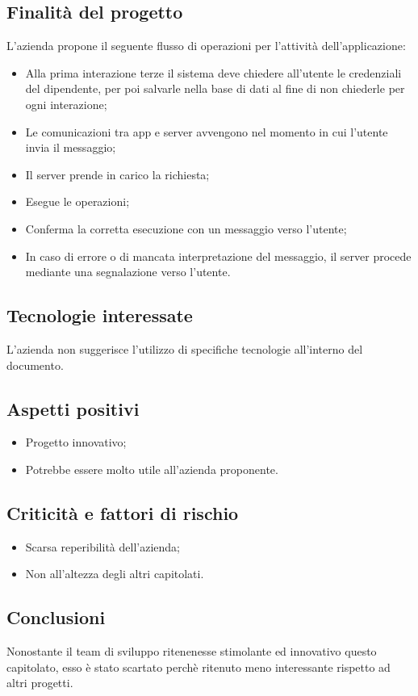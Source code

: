 	\subsection{Finalità del progetto}
		L'azienda propone il seguente flusso di operazioni per l'attività dell'applicazione:
		\begin {itemize}
			\item Alla prima interazione terze il sistema deve chiedere all’utente le credenziali del dipendente, per poi salvarle nella base di dati al fine di non chiederle per ogni interazione;
			\item Le comunicazioni tra app e server avvengono nel momento in cui l'utente invia il messaggio;
			\item Il server prende in carico la richiesta;
			\item Esegue le operazioni;
			\item Conferma la corretta esecuzione con un messaggio verso l'utente;
			\item In caso di errore o di mancata interpretazione del messaggio, il server procede mediante una segnalazione verso l'utente.
		\end {itemize}

	\subsection {Tecnologie interessate}
		L'azienda non suggerisce l'utilizzo di specifiche tecnologie all'interno del documento.

	\subsection{Aspetti positivi}
		\begin{itemize}
			\item Progetto innovativo;
			\item Potrebbe essere molto utile all'azienda proponente.
		\end{itemize}
	\subsection {Criticità e fattori di rischio}
		\begin{itemize}
			\item Scarsa reperibilità dell'azienda;
			\item Non all'altezza degli altri capitolati.
	\end{itemize}
\subsection {Conclusioni}
Nonostante il team di sviluppo ritenenesse stimolante ed innovativo questo capitolato, esso è stato scartato perchè ritenuto meno interessante rispetto ad altri progetti.